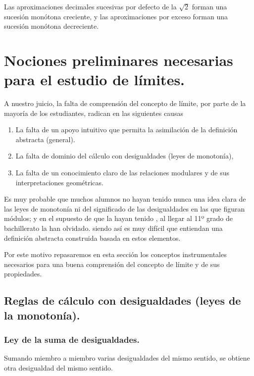 \begin{ejemplo}

Las aproximaciones decimales sucesivas por defecto de la $\sqrt{2}$
forman una sucesión monótona creciente, y las aproximaciones por exceso
forman una sucesión monótona decreciente.

\end{ejemplo}

\section{Nociones preliminares necesarias para el estudio de límites.}

\intro

A nuestro juicio, la falta de comprensión del concepto de límite,
por parte de la mayoría de los estudiantes, radican en las siguientes
causas 
\begin{enumerate}
\item La falta de un apoyo intuitivo que permita la asimilación de la definición
abstracta (general).
\item La falta de dominio del cálculo con desigualdades (leyes de monotonía), 
\item La falta de un conocimiento claro de las relaciones modulares y de
sus interpretaciones geométricas.
\end{enumerate}
Es muy probable que muchos alumnos no hayan tenido nunca una idea
clara de las leyes de monotonía ni del significado de las desigualdades
en las que figuran módulos; y en el supuesto de que la hayan tenido
, al llegar al 11º grado de bachillerato la han olvidado. siendo así
es muy difícil que entiendan una definición abstracta construida basada
en estos elementos.

Por este motivo repasaremos en esta sección los conceptos instrumentales
necesarios para una buena comprensión del concepto de límite y de
sus propiedades.

\subsection{Reglas de cálculo con desigualdades (leyes de la monotonía).}

\subsubsection{Ley de la suma de desigualdades.\vspace*{10pt}
}

\begin{ley}{}

Sumando miembro a miembro varias desigualdades del mismo sentido,
se obtiene otra desigualdad del mismo sentido.

\end{ley}

